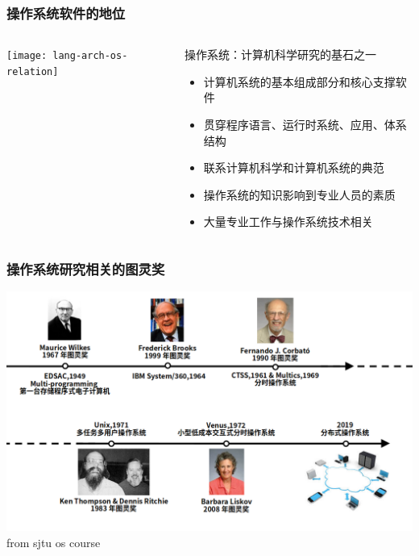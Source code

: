 \begin{frame}
    \frametitle{操作系统软件的地位}
    
            \begin{columns}
    	
    	
    	\begin{column}{0.35\textwidth}	
    		\texttt{[image: lang-arch-os-relation]}	
    	\end{column}
    	
    	\begin{column}{0.65\textwidth}
    		
        操作系统：计算机科学研究的基石之一
        \pause
        \begin{itemize}
            \item 计算机系统的基本组成部分和核心支撑软件
            \item 贯穿程序语言、运行时系统、应用、体系结构
            \item 联系计算机科学和计算机系统的典范 \pause 
            \item 操作系统的知识影响到专业人员的素质
            \item 大量专业工作与操作系统技术相关
        \end{itemize}

         \end{column}
\end{columns}

\end{frame}
\begin{frame}[plain]
    \frametitle{操作系统研究相关的图灵奖}
    \centering
     \includegraphics[width=0.8\linewidth]{turing-os}
     \\
     from sjtu os course
\end{frame}

